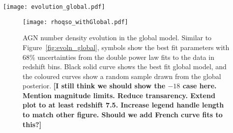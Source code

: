 \documentclass[a4paper,fleqn,usenatbib]{mnras}
\newcommand{\gk}[1]{{\bf \color{notecolor} [#1]}}
\begin{document}
\begin{figure*}
  \begin{center}
    \texttt{[image: evolution\_global.pdf]}
  \end{center}
  \caption{Luminosity function parameter evolution in the global
    model.  The symbols show the best fit parameters with 68\%
    uncertainties from the double power law fits to the data in
    redshift bins.  These points are identical to those in
    Figure~\ref{fig:evoln}, except that bins with BOSS qsos ($z\sim
    2$--$3$) are not shown.  In each panel, the black solid curve
    shows the best fit global model, and the coloured curves show a
    random sample drawn from the global posterior. \gk{Cannot see
      best-fit curves.  Add open and closed circles to legend.}}
  \label{fig:evoln_global}
\end{figure*}

\begin{figure}
  \begin{center}
    \texttt{[image: rhoqso\_withGlobal.pdf]}
  \end{center}
  \caption{AGN number density evolution in the global model.  Similar
    to Figure~\ref{fig:evoln_global}, symbols show the best fit
    parameters with 68\% uncertainties from the double power law fits
    to the data in redshift bins.  Black solid curve shows the best
    fit global model, and the coloured curves show a random sample
    drawn from the global posterior. \gk{I still think we should show
      the $-18$ case here.  Mention magnitude limits.  Reduce
      transarency.  Extend plot to at least redshift 7.5.  Increase
      legend handle length to match other figure. Should we add French
      curve fits to this?}}
  \label{fig:rhoqso}
\end{figure}
\end{document}
